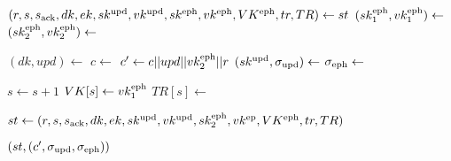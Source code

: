 \algrenewcommand\textproc{}
\algrenewcommand{}
\begin{minipage}{\linewidth}
  {\fontsize{10}{12}\selectfont
  \begin{algorithmic}[1]
    \State $(r,s,s_\text{ack},dk,ek,sk^\text{upd},vk^\text{upd},
                        sk^\text{eph},vk^\text{eph},VK^\text{eph},tr,TR) \gets st$
    \State $(sk_1^\text{eph},vk_1^\text{eph}) \gets$ 
    \State $(sk_2^\text{eph},vk_2^\text{eph}) \gets$ 

    \State $(dk,upd) \gets$ 
    \State $c \gets$ 
    \State $c' \gets c||upd||vk_2^\text{eph}||r$
    \State $(sk^\text{upd},\sigma_\text{upd}) \gets$ 
    \State $\sigma_\text{eph} \gets$ 

    \State $s \gets s+1$
    \State $VK[s] \gets vk_1^\text{eph}$
    \State $TR[s] \gets$ 
    
    
    \State $st \gets (r,s,s_\text{ack},dk,ek,sk^\text{upd},vk^\text{upd},
                        sk_2^\text{eph},vk^\text{ep},VK^\text{eph},tr,TR)$
    
    \State \Return $(st, (c',\sigma_\text{upd},\sigma_\text{eph}))$
    \EndProcedure
   \end{algorithmic}
  }
\end{minipage}
